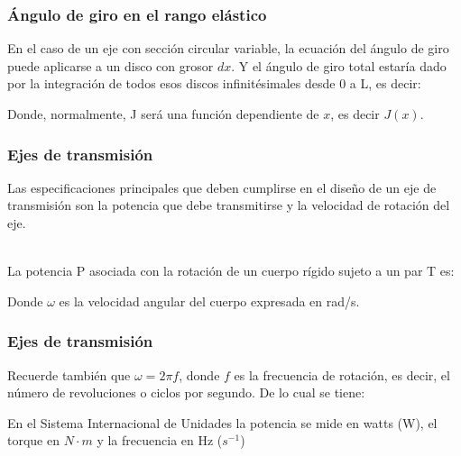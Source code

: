 \documentclass{beamer}
\begin{document}
\begin{frame}
\justifying
\frametitle{Ángulo de giro en el rango elástico}

En el caso de un eje con sección circular variable, la ecuación del ángulo de giro puede aplicarse a un 
disco con grosor $dx$. Y el ángulo de giro total estaría dado por la integración de todos esos discos 
infinitésimales desde 0 a L, es decir:

\begin{center}
\end{center}

Donde, normalmente, J será una función dependiente de $x$, es decir $J(x)$.
\end{frame}



\begin{frame}
\justifying
\frametitle{Ejes de transmisión}

Las especificaciones principales que deben cumplirse en el diseño de un eje de transmisión 
son la potencia que debe transmitirse y la velocidad de rotación del eje.

\hfill \\

La potencia P asociada con la rotación de un cuerpo rígido sujeto a un par T es:

\begin{center}
\end{center}

Donde $\omega$ es la velocidad angular del cuerpo expresada en rad/s.
\end{frame}


\begin{frame}
\justifying
\frametitle{Ejes de transmisión}

Recuerde también que $\omega=2\pi f$, donde $f$ es la frecuencia de rotación, es decir, el 
número de revoluciones o ciclos por segundo. De lo cual se tiene:

\begin{center}
\end{center}

En el Sistema Internacional de Unidades la potencia se mide en watts (W), el torque en $N \cdot m$ y la frecuencia en Hz ($s^{-1}$)

\end{frame}
\end{document}

